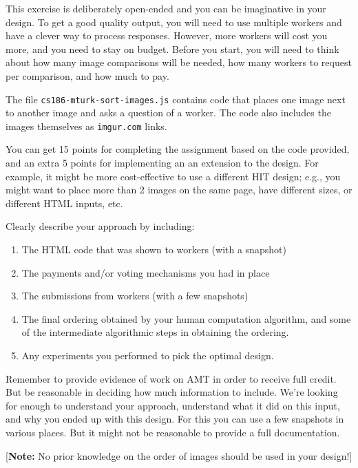 \documentclass[11pt]{article}
\begin{document}
\begin{enumerate}
This exercise is deliberately open-ended and you can be imaginative in
your design. To get a good quality output, you will need to use
multiple workers and have a clever way to process responses. However,
more workers will cost you more, and you need to stay on budget.
Before you start, you will need to think about how many image
comparisons will be needed, how many workers to request per
comparison, and how much to pay.

The file \texttt{cs186-mturk-sort-images.js} contains code that places
one image next to another image and asks a question of a worker. The
code also includes the images themselves as {\tt imgur.com} links.

You can get 15 points for completing the assignment based on the code
provided, and an extra 5 points for implementing an an extension to
the design. 
%
For example, it might be more cost-effective to use a different HIT
design; e.g., you might want to place more than 2 images on the same
page, have different sizes, or different HTML inputs, etc.

Clearly describe your approach by including:
\begin{enumerate}
\item The HTML code that was shown to workers (with a snapshot)
\item The payments and/or voting mechanisms you had in place
\item The submissions from workers (with a few snapshots)
\item The final ordering obtained by your human computation
algorithm, and some of the intermediate algorithmic steps in obtaining
the ordering.
\item Any experiments you performed to pick the optimal design.
\end{enumerate}

Remember to provide evidence of work on AMT in order to receive full
credit.
But be reasonable in deciding how much information to include. We're looking
for enough to understand your approach, understand what it did on
this input, and why you ended up with this design. For this you can
use a few snapshots in various places. But it might not be reasonable
to provide a full documentation. 

[\textbf{Note:} No prior knowledge on the order of images should
be used in your design!]

\end{enumerate}
\end{document}
